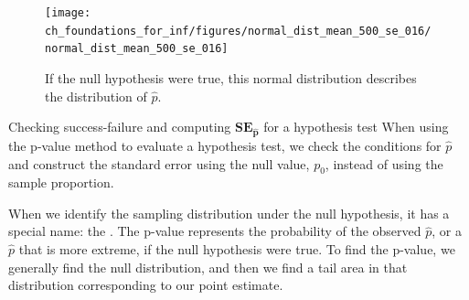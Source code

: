\begin{figure}[h]
\centering
\texttt{[image: ch\_foundations\_for\_inf/figures/normal\_dist\_mean\_500\_se\_016/normal\_dist\_mean\_500\_se\_016]}
\caption{
  If the null hypothesis were true, this normal distribution
  describes the distribution of $\hat{p}$.}
\label{normal_dist_mean_500_se_016}
\end{figure}

\begin{onebox}{Checking success-failure and computing
      $\mathbf{SE_{\hat{p}}}$ for a hypothesis test}
  When using the p-value method to evaluate a hypothesis test,
  we check the conditions for $\hat{p}$ and construct the
  standard error using the null value, $p_0$, instead of using
  the sample proportion.
\end{onebox}

When we identify the sampling distribution under the null hypothesis,
it has a special name: the .
The p-value represents the probability of the observed $\hat{p}$,
or a $\hat{p}$ that is more extreme,
if the null hypothesis were true.
To find the p-value, we generally find the null distribution,
and then we find a tail area in that distribution corresponding
to our point estimate.

